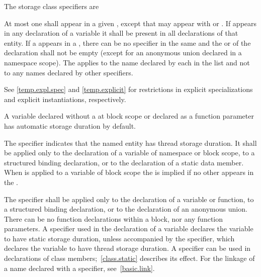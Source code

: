 \pnum
The storage class specifiers are
\begin{bnf}
\br
    \br
    \br
    \br
\end{bnf}

At most one  shall appear in a given
, except that  may appear with  or
. If  appears in any declaration of
a variable it shall be present in all declarations of that entity. If a
appears in a , there can be no
 specifier in the same  and
the  or 
of the declaration shall not be
empty (except for an anonymous union declared in a namespace scope). The
 applies to the name declared by each
 in the list and not to any names declared by
other specifiers.
\begin{note}
See \ref{temp.expl.spec} and \ref{temp.explicit} for restrictions
in explicit specializations and explicit instantiations, respectively.
\end{note}

\pnum
\begin{note}
A variable declared without a 
at block scope or declared as a function parameter
has automatic storage duration by default.
\end{note}

\pnum
The  specifier
indicates that the named entity has thread storage duration. It
shall be applied only
to the declaration of a variable of namespace or block scope,
to a structured binding declaration, or
to the declaration of a static data member.
When  is applied to a variable of block scope the
  is implied if no other
 appears in the
.

\pnum
{}%
The  specifier shall be applied only
to the declaration of a variable or function,
to a structured binding declaration, or
to the declaration of an anonymous union.
There can be no
 function declarations within a block, nor any
 function parameters. A  specifier used in
the declaration of a variable declares the variable to have static storage
duration, unless accompanied by the
 specifier, which declares the variable to have thread
storage duration. A  specifier can be
used in declarations of class members;~\ref{class.static} describes its
effect.
%
For the linkage of a name declared with a  specifier,
see~\ref{basic.link}.

